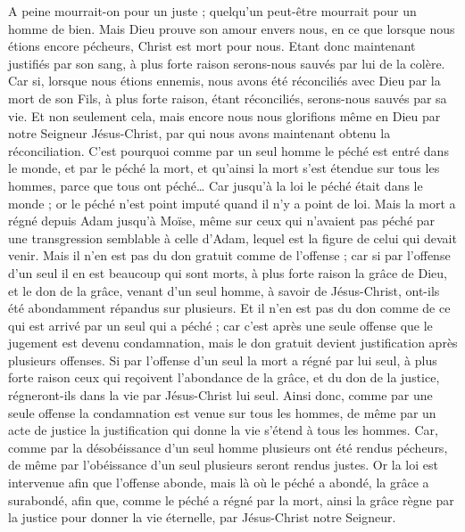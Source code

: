 \begin{multicols}{2}
A peine mourrait-on pour un juste ; quelqu’un peut-être mourrait pour un homme de bien.
Mais Dieu prouve son amour envers nous, en ce que lorsque nous étions encore pécheurs, Christ est mort pour nous.
Etant donc maintenant justifiés par son sang, à plus forte raison serons-nous sauvés par lui de la colère.
Car si, lorsque nous étions ennemis, nous avons été réconciliés avec Dieu par la mort de son Fils, à plus forte raison, étant réconciliés, serons-nous sauvés par sa vie.
Et non seulement cela, mais encore nous nous glorifions même en Dieu par notre Seigneur Jésus-Christ, par qui nous avons maintenant obtenu la réconciliation.
C'est pourquoi comme par un seul homme le péché est entré dans le monde, et par le péché la mort, et qu’ainsi la mort s’est étendue sur tous les hommes, parce que tous ont péché…
Car jusqu'à la loi le péché était dans le monde ; or le péché n'est point imputé quand il n'y a point de loi.
Mais la mort a régné depuis Adam jusqu'à Moïse, même sur ceux qui n'avaient pas péché par une transgression semblable à celle d’Adam, lequel est la figure de celui qui devait venir.
Mais il n'en est pas du don gratuit comme de l'offense ; car si par l'offense d'un seul il en est beaucoup qui sont morts, à plus forte raison la grâce de Dieu, et le don de la grâce, venant d'un seul homme, à savoir de Jésus-Christ, ont-ils été abondamment répandus sur plusieurs.
Et il n'en est pas du don comme de ce qui est arrivé par un seul qui a péché ; car c’est après une seule offense que le jugement est devenu condamnation, mais le don gratuit devient justification après plusieurs offenses.
Si par l'offense d'un seul la mort a régné par lui seul, à plus forte raison ceux qui reçoivent l'abondance de la grâce, et du don de la justice, régneront-ils dans la vie par Jésus-Christ lui seul.
Ainsi donc, comme par une seule offense la condamnation est venue sur tous les hommes, de même par un acte de justice la justification qui donne la vie s’étend à tous les hommes.
Car, comme par la désobéissance d'un seul homme plusieurs ont été rendus pécheurs, de même par l'obéissance d'un seul plusieurs seront rendus justes.
Or la loi est intervenue afin que l'offense abonde, mais là où le péché a abondé, la grâce a surabondé,
afin que, comme le péché a régné par la mort, ainsi la grâce règne par la justice pour donner la vie éternelle, par Jésus-Christ notre Seigneur.

\end{multicols}
